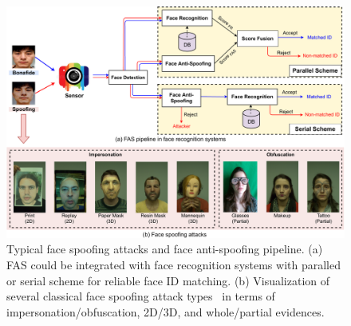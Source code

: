 \documentclass[10pt,journal,compsoc]{IEEEtran}
\begin{document}
\begin{figure}
\centering
\includegraphics[scale=0.4]{Figures/pipeline.pdf}
\vspace{-0.3em}
  \caption{ 
  Typical face spoofing attacks and face anti-spoofing pipeline. (a) FAS could be integrated with face recognition systems with paralled or serial scheme for reliable face ID matching. (b) Visualization of several classical face spoofing attack types~\cite{heusch2020deep} in terms of impersonation/obfuscation, 2D/3D, and whole/partial evidences.
  }
  \vspace{-0.8em}
\label{fig:pipeline}
\end{figure}
\end{document}
